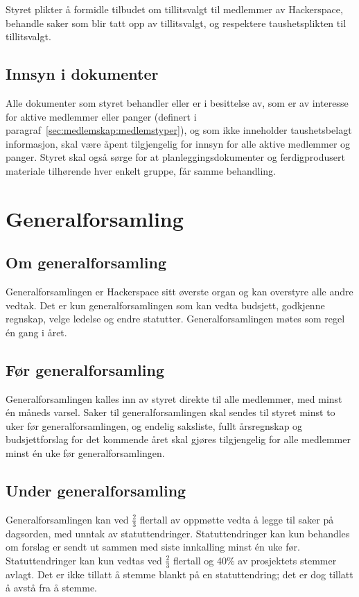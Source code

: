 Styret plikter å formidle tilbudet om tillitsvalgt til medlemmer av Hackerspace, behandle saker som blir tatt opp av tillitsvalgt, og respektere taushetsplikten til tillitsvalgt.

\subsection{Innsyn i dokumenter}\label{sec:struktur:innsyn}
Alle dokumenter som styret behandler eller er i besittelse av, som er av interesse for aktive medlemmer eller panger (definert i paragraf~\ref{sec:medlemskap:medlemstyper}), og som ikke inneholder taushetsbelagt informasjon, skal være åpent tilgjengelig for innsyn for alle aktive medlemmer og panger.
Styret skal også sørge for at planleggingsdokumenter og ferdigprodusert materiale tilhørende hver enkelt gruppe, får samme behandling.


\section{Generalforsamling}\label{sec:generalforsamling}
\subsection{Om generalforsamling}\label{sec:generalforsamling:om}
Generalforsamlingen er Hackerspace sitt øverste organ og kan overstyre alle andre vedtak.
Det er kun generalforsamlingen som kan vedta budsjett, godkjenne regnskap, velge ledelse og endre statutter.
Generalforsamlingen møtes som regel én gang i året.

\subsection{Før generalforsamling}\label{sec:generalforsamling:før}
Generalforsamlingen kalles inn av styret direkte til alle medlemmer, med minst én måneds varsel.
Saker til generalforsamlingen skal sendes til styret minst to uker før generalforsamlingen, og endelig saksliste, fullt årsregnskap og budsjettforslag for det kommende året skal gjøres tilgjengelig for alle medlemmer minst én uke før generalforsamlingen.

\subsection{Under generalforsamling}\label{sec:generalforsamling:under}
Generalforsamlingen kan ved $\frac{2}{3}$ flertall av oppmøtte vedta å legge til saker på dagsorden, med unntak av statuttendringer.
Statuttendringer kan kun behandles om forslag er sendt ut sammen med siste innkalling minst én uke før.
Statuttendringer kan kun vedtas ved $\frac{2}{3}$ flertall og 40\% av prosjektets stemmer avlagt.
Det er ikke tillatt å stemme blankt på en statuttendring; det er dog tillatt å avstå fra å stemme.

